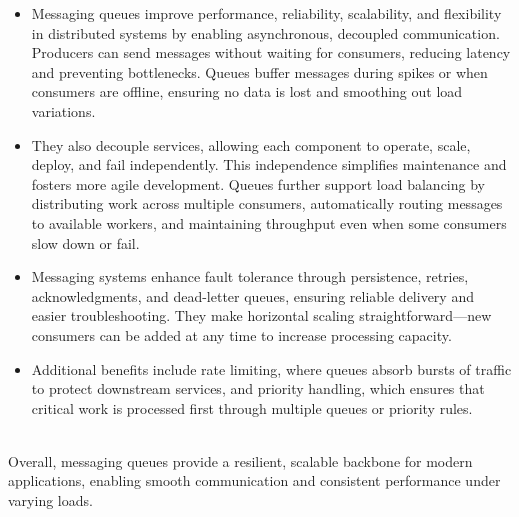 \begin{itemize}
\item
\protect{}\label{1fOSScjCHeEa6B-5GD3On}
Messaging queues improve performance, reliability, scalability, and flexibility in distributed systems by enabling asynchronous, decoupled communication. Producers can send messages without waiting for consumers, reducing latency and preventing bottlenecks. Queues buffer messages during spikes or when consumers are offline, ensuring no data is lost and smoothing out load variations.
\item
\protect{}\label{08GqSQxTQxno_bKEyJkoK}
They also decouple services, allowing each component to operate, scale, deploy, and fail independently. This independence simplifies maintenance and fosters more agile development. Queues further support load balancing by distributing work across multiple consumers, automatically routing messages to available workers, and maintaining throughput even when some consumers slow down or fail.
\item
\protect{}\label{UjcXxRt7tqhCzWnbsmLmu}
Messaging systems enhance fault tolerance through persistence, retries, acknowledgments, and dead-letter queues, ensuring reliable delivery and easier troubleshooting. They make horizontal scaling straightforward---new consumers can be added at any time to increase processing capacity.
\item
\protect{}\label{7dNNmBQUoF8ErPNJhd1hn}
Additional benefits include rate limiting, where queues absorb bursts of traffic to protect downstream services, and priority handling, which ensures that critical work is processed first through multiple queues or priority rules.
\end{itemize}
\\
Overall, messaging queues provide a resilient, scalable backbone for modern applications, enabling smooth communication and consistent performance under varying loads.

